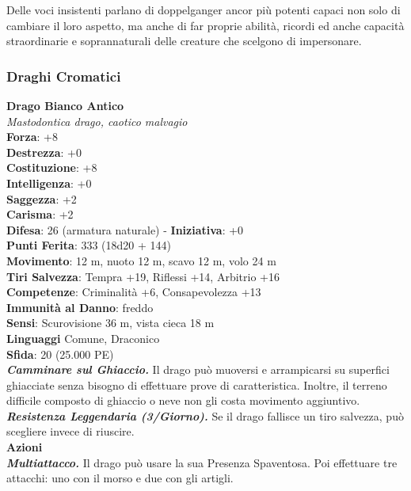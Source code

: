 \begin{multicols}{2}
Delle voci insistenti parlano di doppelganger ancor più potenti capaci non solo di cambiare il loro aspetto, ma anche di far proprie abilità, ricordi ed anche capacità straordinarie e soprannaturali delle creature che scelgono di impersonare.\\


\subsubsection{Draghi Cromatici}

\medskip\textbf{Drago Bianco Antico}\\
\emph{Mastodontica drago, caotico malvagio}\\
\textbf{Forza}: +8\\
\textbf{Destrezza}: +0\\
\textbf{Costituzione}: +8\\
\textbf{Intelligenza}: +0\\
\textbf{Saggezza}: +2\\
\textbf{Carisma}: +2\\
\textbf{Difesa}: 26 (armatura naturale) - \textbf{Iniziativa}: +0\\
\textbf{Punti Ferita}: 333 (18d20 + 144)\\
\textbf{Movimento}: 12 m, nuoto 12 m, scavo 12 m, volo 24 m\\
\textbf{Tiri Salvezza}: Tempra +19, Riflessi +14, Arbitrio +16\\
\textbf{Competenze}: Criminalità +6, Consapevolezza +13\\
\textbf{Immunità al Danno}: freddo\\
\textbf{Sensi}: Scurovisione 36 m, vista cieca 18 m\\
\textbf{Linguaggi} Comune, Draconico\\
\textbf{Sfida}: 20 (25.000 PE)\smallskip\\
\emph{\textbf{Camminare sul Ghiaccio.}} Il drago può muoversi e arrampicarsi su superfici ghiacciate senza bisogno di effettuare prove di caratteristica. Inoltre, il terreno difficile composto di ghiaccio o neve non gli costa movimento aggiuntivo.\\
\emph{\textbf{Resistenza Leggendaria (3/Giorno).}} Se il drago fallisce un tiro salvezza, può scegliere invece di riuscire.\\
\smallskip\textbf{Azioni}\\
\emph{\textbf{Multiattacco.}} Il drago può usare la sua Presenza Spaventosa. Poi effettuare tre attacchi: uno con il morso e due con gli artigli.\\

\end{multicols}
